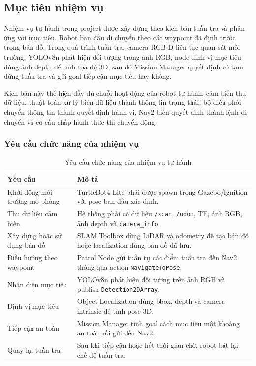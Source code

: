 \subsection{Mục tiêu nhiệm vụ}
\label{subsec:mission-objective}

Nhiệm vụ tự hành trong project được xây dựng theo kịch bản tuần tra và phản ứng với mục tiêu. Robot ban đầu di chuyển theo các waypoint đã định trước trong bản đồ. Trong quá trình tuần tra, camera RGB-D liên tục quan sát môi trường, YOLOv8n phát hiện đối tượng trong ảnh RGB, node định vị mục tiêu dùng ảnh depth để tính tọa độ 3D, sau đó Mission Manager quyết định có tạm dừng tuần tra và gửi goal tiếp cận mục tiêu hay không.

Kịch bản này thể hiện đầy đủ chuỗi hoạt động của robot tự hành: cảm biến thu dữ liệu, thuật toán xử lý biến dữ liệu thành thông tin trạng thái, bộ điều phối chuyển thông tin thành quyết định hành vi, Nav2 biến quyết định thành lệnh di chuyển và cơ cấu chấp hành thực thi chuyển động.

\subsubsection{Yêu cầu chức năng của nhiệm vụ}
\label{subsubsec:mission-functional-requirements}

\begin{table}[H]
    \centering
    \caption{Yêu cầu chức năng của nhiệm vụ tự hành}
    \label{tab:mission-functional-requirements}
    \renewcommand{\arraystretch}{1.25}
    \small
    \begin{tabularx}{\textwidth}{|>{\raggedright\arraybackslash}p{}|>{\raggedright\arraybackslash}X|}
        \hline
        \textbf{Yêu cầu} & \textbf{Mô tả} \\
        \hline
        Khởi động môi trường mô phỏng & TurtleBot4 Lite phải được spawn trong Gazebo/Ignition với pose ban đầu xác định. \\
        \hline
        Thu dữ liệu cảm biến & Hệ thống phải có dữ liệu \texttt{/scan}, \texttt{/odom}, TF, ảnh RGB, ảnh depth và \texttt{camera\_info}. \\
        \hline
        Xây dựng hoặc sử dụng bản đồ & SLAM Toolbox dùng LiDAR và odometry để tạo bản đồ hoặc localization dùng bản đồ đã lưu. \\
        \hline
        Điều hướng theo waypoint & Patrol Node gửi tuần tự các điểm tuần tra đến Nav2 thông qua action \texttt{NavigateToPose}. \\
        \hline
        Nhận diện mục tiêu & YOLOv8n phát hiện đối tượng trên ảnh RGB và publish \texttt{Detection2DArray}. \\
        \hline
        Định vị mục tiêu & Object Localization dùng bbox, depth và camera intrinsic để tính pose 3D. \\
        \hline
        Tiếp cận an toàn & Mission Manager tính goal cách mục tiêu một khoảng an toàn rồi gửi đến Nav2. \\
        \hline
        Quay lại tuần tra & Sau khi tiếp cận hoặc hết thời gian chờ, robot bật lại chế độ tuần tra. \\
        \hline
    \end{tabularx}
\end{table}

